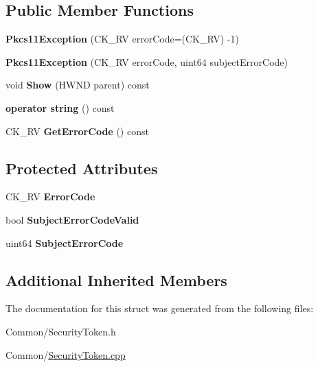 \subsection*{Public Member Functions}
\begin{DoxyCompactItemize}
\item 
\mbox{\label{struct_gost_crypt_1_1_pkcs11_exception_a5a40f3843dee86f76cc06c91ed290058}} 
{\bfseries Pkcs11\+Exception} (C\+K\+\_\+\+RV error\+Code=(C\+K\+\_\+\+RV) -\/1)
\item 
\mbox{\label{struct_gost_crypt_1_1_pkcs11_exception_a8d19ca512f9b31f4bb81e85fc887c47f}} 
{\bfseries Pkcs11\+Exception} (C\+K\+\_\+\+RV error\+Code, uint64 subject\+Error\+Code)
\item 
\mbox{\label{struct_gost_crypt_1_1_pkcs11_exception_ad03ab3d5d4c1acce022d7c046e8b6612}} 
void {\bfseries Show} (H\+W\+ND parent) const
\item 
\mbox{\label{struct_gost_crypt_1_1_pkcs11_exception_ab1ec1b87f2040621abd6e5e2c572c80f}} 
{\bfseries operator string} () const
\item 
\mbox{\label{struct_gost_crypt_1_1_pkcs11_exception_a68d578db5803f8854b4e0ef7f6712693}} 
C\+K\+\_\+\+RV {\bfseries Get\+Error\+Code} () const
\end{DoxyCompactItemize}
\subsection*{Protected Attributes}
\begin{DoxyCompactItemize}
\item 
\mbox{\label{struct_gost_crypt_1_1_pkcs11_exception_a49582da7f5a25fd46583ad8c76d5b259}} 
C\+K\+\_\+\+RV {\bfseries Error\+Code}
\item 
\mbox{\label{struct_gost_crypt_1_1_pkcs11_exception_a782964142633ed63846385926faebf61}} 
bool {\bfseries Subject\+Error\+Code\+Valid}
\item 
\mbox{\label{struct_gost_crypt_1_1_pkcs11_exception_a8b7e453678570756a39112e517ed3c45}} 
uint64 {\bfseries Subject\+Error\+Code}
\end{DoxyCompactItemize}
\subsection*{Additional Inherited Members}


The documentation for this struct was generated from the following files\+:\begin{DoxyCompactItemize}
\item 
Common/Security\+Token.\+h\item 
Common/\hyperlink{_security_token_8cpp}{Security\+Token.\+cpp}\end{DoxyCompactItemize}
